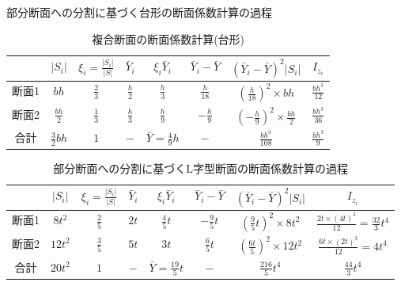 \documentclass[10pt,a4j]{jarticle}
\begin{document}
\begin{table}
\begin{center}
	\caption{部分断面への分割に基づく台形の断面係数計算の過程}
	\caption{複合断面の断面係数計算(台形)}
	\begin{tabular}{c||c|c|c|c|c|c|c}
		&
		$\left| S_i \right|$ & 
		$ \xi_i=\frac{\left| S_i \right|}{\left| S\right|} $  &
		$ \bar{Y}_i $ & 
		$ \xi_i\bar{Y}_i $ & 
		$\bar{Y}_i -\bar Y$ & 
		$ \left(\bar{Y}_i -\bar Y\right)^2\left| S_i \right|$ & 
		$ I_{z_i}$  
		\\
		\hline 
		断面1&	
		$bh$ & 
		$\frac{2}{3}$  &
		$\frac{h}{2}$ & 
		$\frac{h}{3}$ & 
		$\frac{h}{18}$ & 
		$\left(\frac{h}{18}\right)^2 \times bh $ & 
		$\frac{bh^3}{12}$  
		\\
		\hline
		断面2&	
		$\frac{bh}{2}$ & 
		$\frac{1}{3}$  &
		$\frac{h}{3}$ & 
		$\frac{h}{9}$ & 
		$-\frac{h}{9}$ & 
		$\left(-\frac{h}{9}\right)^2 \times \frac{bh}{2}$ & 
		$\frac{bh^3}{36}$  
		\\
		\hline 
		合計&	
		$\frac{3}{2}bh$ & 
		$1$  &
		$-$ & 
		$\bar Y=\frac{4}{9}h$ & 
		$-$ & 
		$\frac{bh^3}{108}$ & 
		$\frac{bh^3}{9}$ 
	\end{tabular}
	\label{tbl1}
\end{center}
\end{table}
\begin{table}
\begin{center}
	\caption{部分断面への分割に基づくL字型断面の断面係数計算の過程}
	\begin{tabular}{c||c|c|c|c|c|c|c}
		&
		$\left| S_i \right|$ & 
		$ \xi_i=\frac{\left| S_i \right|}{\left| S\right|} $  &
		$ \bar{Y}_i $ & 
		$ \xi_i\bar{Y}_i $ & 
		$\bar{Y}_i -\bar Y$ & 
		$ \left(\bar{Y}_i -\bar Y\right)^2\left| S_i \right|$ & 
		$ I_{z_i}$  
		\\
		\hline 
		断面1&	
		$8t^2$ & 
		$\frac{2}{5}$  &
		$2t$ & 
		$\frac{4}{5}t$ & 
		$-\frac{9}{5}t$ & 
		$\left(\frac{9}{5}t\right)^2 \times 8t^2 $ & 
		$\frac{2t\times (4t)^3}{12}=\frac{32}{3}t^4$  
		\\
		\hline
		断面2&	
		$12t^2$ & 
		$\frac{3}{5}$  &
		$5t$ & 
		$3t $ & 
		$\frac{6}{5}t$ & 
		$\left(\frac{6t}{5}\right)^2 \times 12t^2 $ & 
		$\frac{6t\times (2t)^3}{12}=4t^4$  
		\\
		\hline 
		合計&	
		$20t^2$ & 
		$1$  &
		$-$ & 
		$\bar Y=\frac{19}{5}t$ & 
		$-$ & 
		$\frac{216}{5}t^4$ & 
		$\frac{44}{3}t^4$ 
	\end{tabular}
\label{tbl2}
\end{center}
\end{table}
\end{document}

